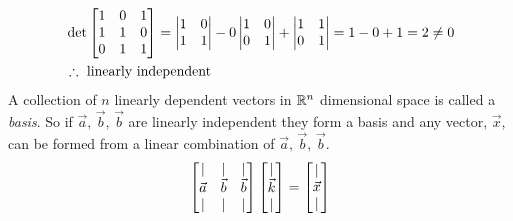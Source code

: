 \documentclass[11pt, fleqn]{article}
\begin{document}
\begin{align*}
    &\det\matrixx{1&0&1\\1&1&0\\0&1&1}=\detmatrix{1&0\\1&1}-0\detmatrix{1&0\\0&1}+\detmatrix{1&1\\0&1}=1-0+1=2\neq0\\
    &\therefore\text{ linearly independent}
\end{align*}
A collection of $n$ linearly dependent vectors in $\mathbb{R}^n$ dimensional space is called a \textit{basis}. So if $\vec{a},\,\vec{b},\,\vec{b}$ are linearly independent they form a basis and any vector, $\vec{x}$, can be formed from a linear combination of $\vec{a},\,\vec{b},\,\vec{b}$.
$$\matrixx{|&|&|\\\vec{a}&\vec{b}&\vec{b}\\|&|&|}\matrixx{|\\\vec{k}\\|}=\matrixx{|\\\vec{x}\\|}$$
\end{document}
